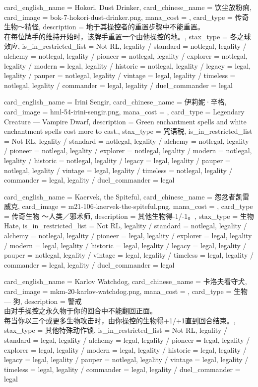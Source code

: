 \documentclass[lang = cn, color = black, 10pt]{AllThatStax}
\begin{document}
\card
{
	card_english_name = {Hokori, Dust Drinker},
	card_chinese_name = {饮尘放粉痢},
	card_image = bok-7-hokori-dust-drinker.png,
	mana_cost = ,
	card_type = 传奇生物～精怪,
	description = {地于其操控者的重置步骤中不能重置。\\
		在每位牌手的维持开始时，该牌手重置一个由他操控的地。},
	stax_type = 冬之球效应,
	is_in_restricted_list = Not RL,
	legality / standard = notlegal,
	legality / alchemy = notlegal,
	legality / pioneer = notlegal,
	legality / explorer = notlegal,
	legality / modern = legal,
	legality / historic = notlegal,
	legality / legacy = legal,
	legality / pauper = notlegal,
	legality / vintage = legal,
	legality / timeless = notlegal,
	legality / commander = legal,
	legality / duel_commander = legal
}

\card
{
	card_english_name = {Irini Sengir},
	card_chinese_name = {伊莉妮·辛格},
	card_image = hml-54-irini-sengir.png,
	mana_cost = ,
	card_type = Legendary Creature — Vampire Dwarf,
	description = {Green enchantment spells and white enchantment spells cost  more to cast.},
	stax_type = 咒语税,
	is_in_restricted_list = Not RL,
	legality / standard = notlegal,
	legality / alchemy = notlegal,
	legality / pioneer = notlegal,
	legality / explorer = notlegal,
	legality / modern = notlegal,
	legality / historic = notlegal,
	legality / legacy = legal,
	legality / pauper = notlegal,
	legality / vintage = legal,
	legality / timeless = notlegal,
	legality / commander = legal,
	legality / duel_commander = legal
}

\card
{
	card_english_name = {Kaervek, the Spiteful},
	card_chinese_name = {怨忿者凯雷威克},
	card_image = m21-106-kaervek-the-spiteful.png,
	mana_cost = ,
	card_type = 传奇生物 ～人类／邪术师,
	description = {其他生物得-1/-1。},
	stax_type = 生物Hate,
	is_in_restricted_list = Not RL,
	legality / standard = notlegal,
	legality / alchemy = notlegal,
	legality / pioneer = legal,
	legality / explorer = legal,
	legality / modern = legal,
	legality / historic = legal,
	legality / legacy = legal,
	legality / pauper = notlegal,
	legality / vintage = legal,
	legality / timeless = legal,
	legality / commander = legal,
	legality / duel_commander = legal
}

\card
{
	card_english_name = {Karlov Watchdog},
	card_chinese_name = {卡洛夫看守犬},
	card_image = mkm-20-karlov-watchdog.png,
	mana_cost = ,
	card_type = 生物 — 狗,
	description = {警戒\\
		由对手操控之永久物于你的回合中不能翻回正面。\\
		每当你以三个或更多生物攻击时，由你操控的生物得+1/+1直到回合结束。},
	stax_type = 其他特殊动作锁,
	is_in_restricted_list = Not RL,
	legality / standard = legal,
	legality / alchemy = legal,
	legality / pioneer = legal,
	legality / explorer = legal,
	legality / modern = legal,
	legality / historic = legal,
	legality / legacy = legal,
	legality / pauper = notlegal,
	legality / vintage = legal,
	legality / timeless = legal,
	legality / commander = legal,
	legality / duel_commander = legal
}
\end{document}
